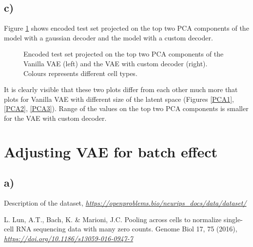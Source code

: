 \documentclass[a4paper,11pt]{article}
\begin{document}
\subsection*{c)}
Figure \ref{VAE:PCAcomp} shows encoded test set projected on the top two PCA components of the model with a gaussian decoder and the model with a custom decoder.
\begin{figure}[H]
    \centering
    \qquad
    \caption{Encoded test set projected on the top two PCA components of the Vanilla VAE (left) and the VAE with custom decoder (right). Colours represents different cell types.}%
    \label{VAE:PCAcomp}
\end{figure}
\noindent It is clearly visible that these two plots differ from each other much more that plots for Vanilla VAE with different size of the latent space (Figures \ref{PCA1}, \ref{PCA2}, \ref{PCA3}). Range of the values on the top two PCA components is smaller for the VAE with custom decoder.

\section{Adjusting VAE for batch effect}
\subsection*{a)}

\begin{thebibliography}{9}

    Description of the dataset,
    \emph{\href{https://openproblems.bio/neurips_docs/data/dataset/}{https://openproblems.bio/neurips\_docs/data/dataset/}}

    L. Lun, A.T., Bach, K. \& Marioni, J.C. Pooling across cells to normalize 
    single-cell RNA sequencing data with many zero counts. Genome Biol 17, 75 (2016),
    \emph{\href{https://doi.org/10.1186/s13059-016-0947-7}{https://doi.org/10.1186/s13059-016-0947-7}}

\end{thebibliography}
\end{document}
